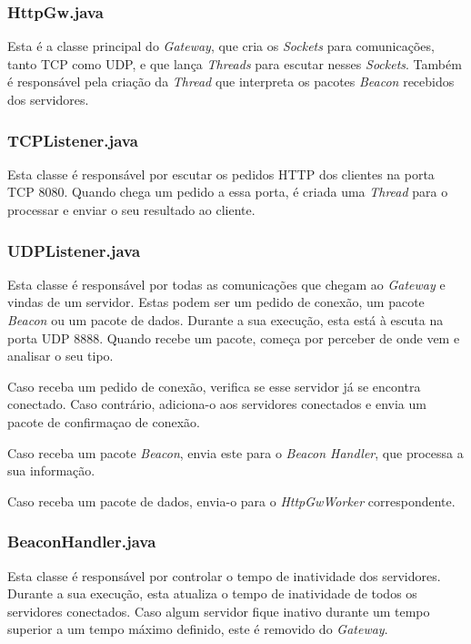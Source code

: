 \documentclass[11pt]{article}
\begin{document}
\subsubsection{HttpGw.java}

Esta é a classe principal do \textit{Gateway}, que cria os \textit{Sockets} para comunicações, tanto TCP como UDP, e que lança \textit{Threads} para escutar nesses \textit{Sockets}. Também é responsável pela criação da \textit{Thread} que interpreta os pacotes \textit{Beacon} recebidos dos servidores.

\subsubsection{TCPListener.java}

Esta classe é responsável por escutar os pedidos HTTP dos clientes na porta TCP 8080. Quando chega um pedido a essa porta, é criada uma \textit{Thread} para o processar e enviar o seu resultado ao cliente.


\subsubsection{UDPListener.java}

Esta classe é responsável por todas as comunicações que chegam ao \textit{Gateway} e vindas de um servidor. Estas podem ser um pedido de conexão, um pacote \textit{Beacon} ou um pacote de dados. Durante a sua execução, esta está à escuta na porta UDP 8888. Quando recebe um pacote, começa por perceber de onde vem e analisar o seu tipo.

Caso receba um pedido de conexão, verifica se esse servidor já se encontra conectado. Caso contrário, adiciona-o aos servidores conectados e envia um pacote de confirmaçao de conexão.

Caso receba um pacote \textit{Beacon}, envia este para o \textit{Beacon Handler}, que processa a sua informação.

Caso receba um pacote de dados, envia-o para o \textit{HttpGwWorker} correspondente.

\subsubsection{BeaconHandler.java}

Esta classe é responsável por controlar o tempo de inatividade dos servidores. Durante a sua execução, esta atualiza o tempo de inatividade de todos os servidores conectados. Caso algum servidor fique inativo
durante um tempo superior a um tempo máximo definido, este é removido do \textit{Gateway}.
\end{document}
